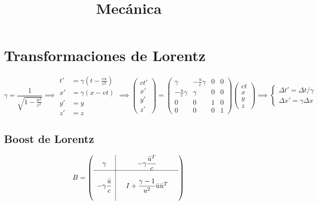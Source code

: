\documentclass{myclass}
\title{Mecánica}
\newcommand{\1}{\tikz[baseline=(char.base)]{
            \node[shape=circle,draw,inner sep=1pt] (char) {1};}}
\newcommand{\2}{\tikz[baseline=(char.base)]{
            \node[shape=circle,draw,inner sep=1pt] (char) {2};}}
\newcommand{\g}{\gamma}
\begin{document}
\maketitle
\tableofcontents
\newpage

\section{Transformaciones de Lorentz}
$$ \gamma = \dfrac{1}{\sqrt{1-\frac{u^2}{c^2}}} \implies 
\begin{aligned}t'&=\gamma \left(t-{\frac {vx}{c^{2}}}\right)\\x'&=\gamma \left(x-vt\right)\\y'&=y\\z'&=z\end{aligned} \implies 
\begin{pmatrix} ct' \\ x' \\ y' \\ z' \end{pmatrix} =
\begin{pmatrix}
\gamma & -\frac{u}{c}\gamma & 0 & 0 \\
-\frac{u}{c}\gamma & \gamma & 0 & 0 \\
                0 & 0 & 1 & 0 \\
                0 & 0 & 0 & 1  \end{pmatrix}\begin{pmatrix} ct \\ x \\ y \\ z \end{pmatrix}
\implies \begin{cases}
\Delta t' = \Delta t/\gamma  \\
\Delta x' =\gamma \Delta x
\end{cases}
$$

\subsection{Boost de Lorentz}
$$
B = \left(\begin{array}{c|ccc}
    \g &  & -\g\dfrac{\Bar{u}^T}{c} &   \\
    \hline
     &  &  &  \\
     -\g\dfrac{\Bar{u}}{c} &  & I+\dfrac{\g-1}{u^2}\Bar{u}\Bar{u}^T &    \\
     &  &  & 
\end{array}\right)
$$
\end{document}
